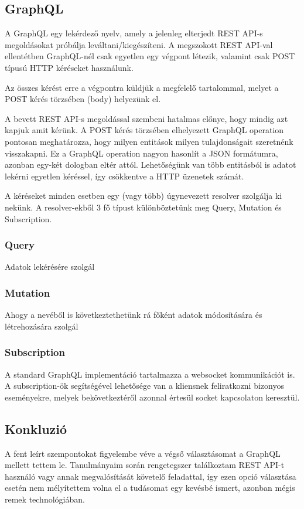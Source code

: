\subsection{GraphQL}

A GraphQL egy lekérdező nyelv, amely a jelenleg elterjedt REST API-s megoldásokat próbálja leváltani/kiegészíteni. A megszokott REST API-val ellentétben GraphQL-nél csak egyetlen egy végpont létezik, valamint csak POST típusú HTTP kéréseket használunk. 

Az összes kérést erre a végpontra küldjük a megfelelő tartalommal, melyet a POST kérés törzsében (body) helyezünk el.

A bevett REST API-s megoldással szembeni hatalmas előnye, hogy mindig azt kapjuk amit kérünk. A POST kérés törzsében elhelyezett GraphQL operation pontosan meghatározza, hogy milyen entitások milyen tulajdonságait szeretnénk visszakapni. Ez a GraphQL operation nagyon hasonlít a JSON formátumra, azonban egy-két dologban eltér attól. Lehetőségünk van több entitásból is adatot lekérni egyetlen kéréssel, így csökkentve a HTTP üzenetek számát.

A kéréseket minden esetben egy (vagy több) úgynevezett resolver szolgálja ki nekünk. 
A resolver-ekből 3 fő típust különböztetünk meg Query, Mutation és Subscription.

\subsubsection{Query}
Adatok lekérésére szolgál
  
\subsubsection{Mutation}
Ahogy a nevéből is következtethetünk rá főként adatok módosítására és létrehozására szolgál
  

\subsubsection{Subscription}
A standard GraphQL implementáció tartalmazza a websocket kommunikációt is. A subscription-ök segítségével lehetősége van a kliensnek feliratkozni bizonyos eseményekre, melyek bekövetkeztéről azonnal értesül socket kapcsolaton keresztül.

\subsection{Konkluzió}
A fent leírt szempontokat figyelembe véve a végső választásomat a GraphQL mellett tettem le.
Tanulmányaim során rengetegszer találkoztam REST API-t használó vagy annak megvalósítását követelő feladattal, így ezen opció választása esetén nem mélyítettem volna el a tudásomat egy kevésbé ismert, azonban mégis remek technológiában.

